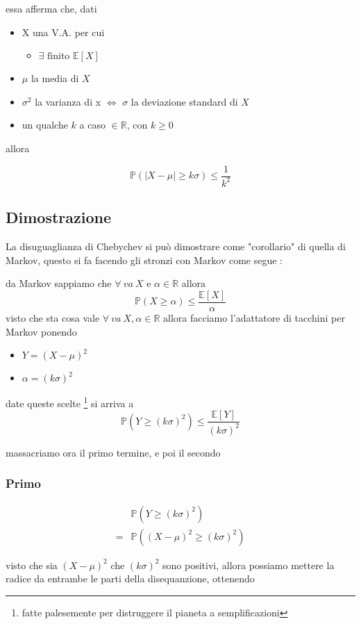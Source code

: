 \documentclass[11pt]{article}
\begin{document}
essa afferma che, dati
\begin{itemize}
\item X una V.A. per cui
\begin{itemize}
\item \(\exists \text{ finito } \mathbb{E}[X]\)
\end{itemize}
\item \(\mu\) la media di \(X\)
\item \(\sigma ^2\) la varianza di x \(\iff\) \(\sigma\) la deviazione standard di \(X\)
\item un qualche \(k\) a caso \(\in \mathbb{R}\), con \(k \geq 0\)
\end{itemize}
allora

\[\mathbb{P} (\lvert X - \mu \rvert \geq k\sigma) \leq \frac{1}{k^2} \]

\subsection{Dimostrazione}
\label{sec:org8c4ae59}
La disuguaglianza di Chebychev si può dimostrare come "corollario" di quella di Markov,
questo si fa facendo gli stronzi con Markov come segue :

da Markov sappiamo che \(\forall\ va\ X\) e \(\alpha \in \mathbb{R}\) allora
\[ \mathbb{P}(X \geq \alpha) \leq \frac{\mathbb{E}[X]}{\alpha} \]
visto che sta cosa vale \(\forall\ va\ X , \alpha \in \mathbb{R}\) allora facciamo
l'adattatore di tacchini per Markov ponendo
\begin{itemize}
\item \(Y = {(X - \mu)}^2\)
\item \(\alpha = {(k\sigma)}^2\)
\end{itemize}

date queste scelte \footnote{fatte palesemente per distruggere il pianeta a semplificazioni}
si arriva a
\[ \mathbb{P}(Y \geq {(k\sigma)}^2) \leq \frac{\mathbb{E}[Y]}{{(k\sigma)}^2} \]

massacriamo ora il primo termine, e poi il secondo
\subsubsection{Primo}
\label{sec:org9037a8b}
\begin{align*}
&\mathbb{P}(Y \geq {(k\sigma)}^2)\\
= &\mathbb{P}({(X - \mu)}^2 \geq {(k\sigma)}^2)
\end{align*}

visto che sia \({(X - \mu)}^2\) che \({(k\sigma)}^2\) sono positivi, allora possiamo mettere la
radice da entrambe le parti della disequanzione, ottenendo
\end{document}
